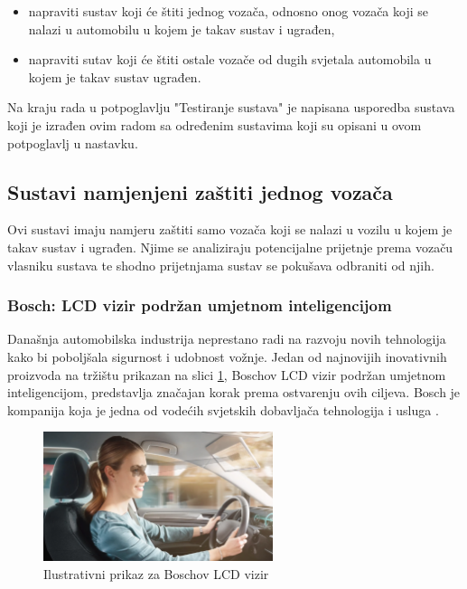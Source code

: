 \documentclass{foi}
\begin{document}
\begin{itemize}[noitemsep]
    \item napraviti sustav koji će štiti jednog vozača, odnosno onog vozača koji se nalazi u automobilu u kojem je takav sustav i ugrađen,
    \item napraviti sutav koji će štiti ostale vozače od dugih svjetala automobila u kojem je takav sustav ugrađen.
\end{itemize}

Na kraju rada u potpoglavlju "Testiranje sustava" je napisana usporedba sustava koji je izrađen ovim radom sa određenim sustavima koji su opisani u ovom potpoglavlj u nastavku.

\subsection{Sustavi namjenjeni zaštiti jednog vozača}

Ovi sustavi imaju namjeru zaštiti samo vozača koji se nalazi u vozilu u kojem je takav sustav i ugrađen. Njime se analiziraju potencijalne prijetnje prema vozaču vlasniku sustava te shodno prijetnjama sustav se pokušava odbraniti od njih.

\subsubsection{Bosch: LCD vizir podržan umjetnom inteligencijom}

Današnja automobilska industrija neprestano radi na razvoju novih tehnologija kako bi poboljšala sigurnost i udobnost vožnje. Jedan od najnovijih inovativnih proizvoda na tržištu prikazan na slici \ref{fig:bosch_lcd}, Boschov LCD vizir podržan umjetnom inteligencijom, predstavlja značajan korak prema ostvarenju ovih ciljeva. Bosch je kompanija koja je jedna od vodećih svjetskih dobavljača tehnologija i usluga \cite{Bosch}.

\begin{figure}[h!]
    \centering
    \includegraphics[width=0.6\textwidth]{slike/bosch_virtual_visor}
    \caption{Ilustrativni prikaz za Boschov LCD vizir \cite{Chris}}
    \label{fig:bosch_lcd}
\end{figure}
\end{document}
